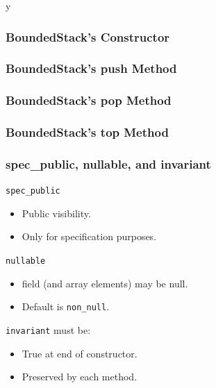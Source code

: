 \if y\MAKEHANDOUTS \documentclass[t,compress,landscape,handout]{beamer}
\begin{document}
\begin{frame}[fragile]
\frametitle{BoundedStack's Constructor}

\end{frame}

\begin{frame}[fragile]
\frametitle{BoundedStack's push Method}

\end{frame}

\begin{frame}[fragile]
\frametitle{BoundedStack's pop Method}

\end{frame}

\begin{frame}[fragile]
\frametitle{BoundedStack's top Method}

\end{frame}

\begin{frame}[fragile]
\frametitle{spec\_public, nullable, and invariant}

\lstinline!spec_public!
\begin{itemize}
\item
Public visibility.

\item
Only for specification purposes.
\end{itemize}


\lstinline!nullable!
\begin{itemize}
\item
field (and array elements) may be null.

\item
Default is \lstinline!non_null!.
\end{itemize}

\lstinline!invariant! must be:
\begin{itemize}
\item
True at end of constructor.

\item
Preserved by each method.
\end{itemize}

\end{frame}
\end{document}
